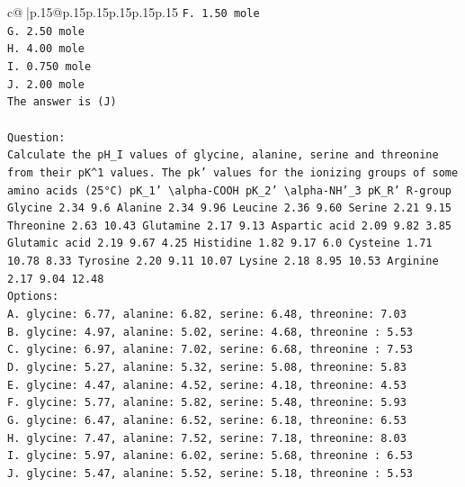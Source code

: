 \documentclass{article}
\begin{document}
{\begin{supertabular}{c@{$\;$}|p{.15\linewidth}@{}p{.15\linewidth}p{.15\linewidth}p{.15\linewidth}p{.15\linewidth}p{.15\linewidth}}
{{{\texttt{F. 1.50 mole} \\
\texttt{G. 2.50 mole} \\
\texttt{H. 4.00 mole} \\
\texttt{I. 0.750 mole} \\
\texttt{J. 2.00 mole} \\
\texttt{The answer is (J)} \\
\\ 
\texttt{Question:} \\
\texttt{Calculate the pH\_I values of glycine, alanine, serine and threonine from their pK\^{}1 values. The pk' values for the ionizing groups of some amino acids (25°C) pK\_1' \textbackslash{}alpha{-}COOH pK\_2' \textbackslash{}alpha{-}NH'\_3 pK\_R' R{-}group Glycine 2.34 9.6 Alanine 2.34 9.96 Leucine 2.36 9.60 Serine 2.21 9.15 Threonine 2.63 10.43 Glutamine 2.17 9.13 Aspartic acid 2.09 9.82 3.85 Glutamic acid 2.19 9.67 4.25 Histidine 1.82 9.17 6.0 Cysteine 1.71 10.78 8.33 Tyrosine 2.20 9.11 10.07 Lysine 2.18 8.95 10.53 Arginine 2.17 9.04 12.48} \\
\texttt{Options:} \\
\texttt{A. glycine: 6.77, alanine: 6.82, serine: 6.48, threonine: 7.03} \\
\texttt{B. glycine: 4.97, alanine: 5.02, serine: 4.68, threonine : 5.53} \\
\texttt{C. glycine: 6.97, alanine: 7.02, serine: 6.68, threonine : 7.53} \\
\texttt{D. glycine: 5.27, alanine: 5.32, serine: 5.08, threonine: 5.83} \\
\texttt{E. glycine: 4.47, alanine: 4.52, serine: 4.18, threonine: 4.53} \\
\texttt{F. glycine: 5.77, alanine: 5.82, serine: 5.48, threonine: 5.93} \\
\texttt{G. glycine: 6.47, alanine: 6.52, serine: 6.18, threonine: 6.53} \\
\texttt{H. glycine: 7.47, alanine: 7.52, serine: 7.18, threonine: 8.03} \\
\texttt{I. glycine: 5.97, alanine: 6.02, serine: 5.68, threonine : 6.53} \\
\texttt{J. glycine: 5.47, alanine: 5.52, serine: 5.18, threonine : 5.53} \\
            }
        }
    }
     \\ \\


\end{supertabular}}
\end{document}
